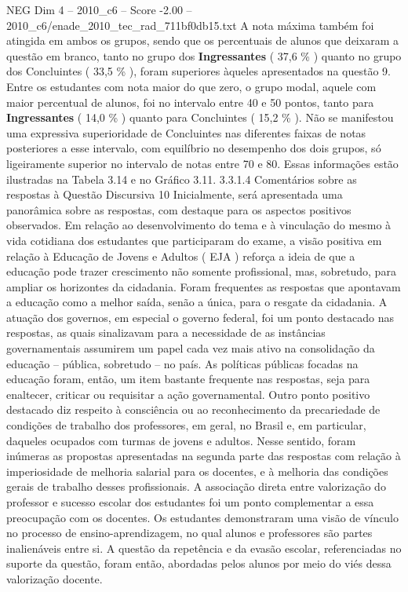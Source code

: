 \begin{textsample}{NEG Dim 4 – 2010\_c6 – Score -2.00 – 2010\_c6/enade\_2010\_tec\_rad\_711bf0db15.txt}
A nota máxima também foi atingida em ambos os grupos, sendo que os percentuais de alunos que deixaram a questão em branco, tanto no grupo dos \textbf{Ingressantes} ( 37,6 \% ) quanto no grupo dos Concluintes ( 33,5 \% ), foram superiores àqueles apresentados na questão 9.
Entre os estudantes com nota maior do que zero, o grupo modal, aquele com maior percentual de alunos, foi no intervalo entre 40 e 50 pontos, tanto para \textbf{Ingressantes} ( 14,0 \% ) quanto para Concluintes ( 15,2 \% ).
Não se manifestou uma expressiva superioridade de Concluintes nas diferentes faixas de notas posteriores a esse intervalo, com equilíbrio no desempenho dos dois grupos, só ligeiramente superior no intervalo de notas entre 70 e 80.
Essas informações estão ilustradas na Tabela 3.14 e no Gráfico 3.11. 3.3.1.4 Comentários sobre as respostas à Questão Discursiva 10 Inicialmente, será apresentada uma panorâmica sobre as respostas, com destaque para os aspectos positivos observados.
Em relação ao desenvolvimento do tema e à vinculação do mesmo à vida cotidiana dos estudantes que participaram do exame, a visão positiva em relação à Educação de Jovens e Adultos ( EJA ) reforça a ideia de que a educação pode trazer crescimento não somente profissional, mas, sobretudo, para ampliar os horizontes da cidadania.
Foram frequentes as respostas que apontavam a educação como a melhor saída, senão a única, para o resgate da cidadania.
A atuação dos governos, em especial o governo federal, foi um ponto destacado nas respostas, as quais sinalizavam para a necessidade de as instâncias governamentais assumirem um papel cada vez mais ativo na consolidação da educação – pública, sobretudo – no país.
As políticas públicas focadas na educação foram, então, um item bastante frequente nas respostas, seja para enaltecer, criticar ou requisitar a ação governamental.
Outro ponto positivo destacado diz respeito à consciência ou ao reconhecimento da precariedade de condições de trabalho dos professores, em geral, no Brasil e, em particular, daqueles ocupados com turmas de jovens e adultos.
Nesse sentido, foram inúmeras as propostas apresentadas na segunda parte das respostas com relação à imperiosidade de melhoria salarial para os docentes, e à melhoria das condições gerais de trabalho desses profissionais.
A associação direta entre valorização do professor e sucesso escolar dos estudantes foi um ponto complementar a essa preocupação com os docentes.
Os estudantes demonstraram uma visão de vínculo no processo de ensino-aprendizagem, no qual alunos e professores são partes inalienáveis entre si.
A questão da repetência e da evasão escolar, referenciadas no suporte da questão, foram então, abordadas pelos alunos por meio do viés dessa valorização docente.

\end{textsample}
